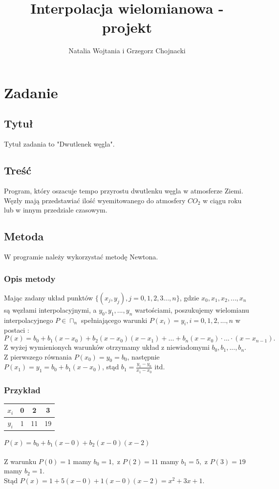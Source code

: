 \documentclass[12pt]{article}
\title{Interpolacja wielomianowa - projekt}
\author{Natalia Wojtania i Grzegorz Chojnacki}
\begin{document}
\maketitle

\section{Zadanie}
\subsection{Tytuł}
Tytuł zadania to "Dwutlenek węgla".
\subsection{Treść}
Program,  który  oszacuje  tempo  przyrostu dwutlenku węgla w atmosferze Ziemi. Węzły mają  przedstawiać  ilość  wyemitowanego  do atmosfery $ CO_{2}$ w  ciągu  roku  lub  w  innym przedziale czasowym.
\subsection{Metoda}
W programie należy wykorzystać metodę Newtona.
\subsubsection{Opis metody}
Mając zadany układ punktów $\{(x_{j},y_{j}),j=0,1,2,3...,n\}$, gdzie $x_{0},x_{1},x_{2},...,x_{n}$ są węzłami interpolacyjnymi, a $y_{0},y_{1},...,y_{n}$ wartościami, poszukujemy wielomianu interpolacyjnego $P \in \sqcap_{n}$ spełniającego warunki $P(x_{i})=y_{i}, i=0,1,2,...,n$ w postaci :
$$ P(x)=b_{0}+b_{1}(x-x_{0})+b_{2}(x-x_{0})(x-x_{1})+...+b_{n}(x-x_{0})\cdot...\cdot(x-x_{n-1}).$$
Z wyżej wymienionych warunków otrzymamy układ z niewiadomymi $b_{0},b_{1},...,b_{n}.$ 
Z pierwszego równania $P(x_{0})=y_{0}=b_{0}$, następnie $P(x_{1})=y_{1}=b_{0}+b_{1}(x-x_{0})$, stąd $b_{1}=\frac{y_{1}-y_{0}}{x_{1}-x_{0}}$ itd.
\subsubsection{Przykład}
\begin{tabular}{c|c|c|c}
$x_{i}$&0&2&3 \\ \hline
$y_{i}$&1&11&19
\end{tabular}
\hspace{10mm} $ P(x)=b_{0}+b_{1}(x-0)+b_{2}(x-0)(x-2)$
\\ \\
Z warunku $P(0)=1$ mamy $ b_{0}=1,$ z $P(2)=11$ mamy $b_{1}=5,$ z $ P(3)=19 $ mamy $ b_{2}=1.$
\\Stąd $P(x)=1+5(x-0)+1(x-0)(x-2)=x^{2}+3x+1.$
\end{document}
